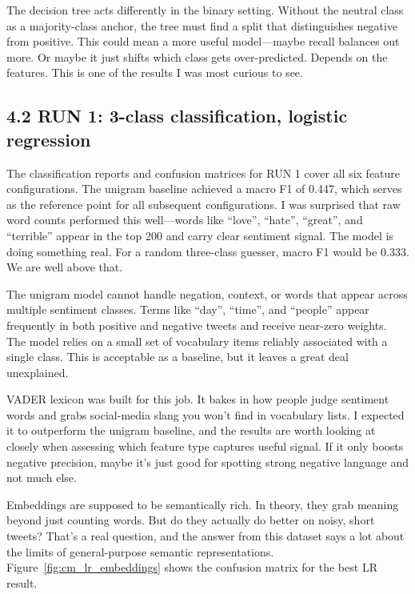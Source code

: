 \documentclass[12pt]{article}
\begin{document}
The decision tree acts differently in the binary setting. Without the neutral class as a majority-class anchor, the tree must find a split that distinguishes negative from positive. This could mean a more useful model---maybe recall balances out more. Or maybe it just shifts which class gets over-predicted. Depends on the features. This is one of the results I was most curious to see.



\subsection*{4.2 RUN 1: 3-class classification, logistic regression}



The classification reports and confusion matrices for RUN 1 cover all six feature configurations. The unigram baseline achieved a macro F1 of 0.447, which serves as the reference point for all subsequent configurations. I was surprised that raw word counts performed this well---words like ``love'', ``hate'', ``great'', and ``terrible'' appear in the top 200 and carry clear sentiment signal. The model is doing something real. For a random three-class guesser, macro F1 would be 0.333. We are well above that.

The unigram model cannot handle negation, context, or words that appear across multiple sentiment classes. Terms like ``day'', ``time'', and ``people'' appear frequently in both positive and negative tweets and receive near-zero weights. The model relies on a small set of vocabulary items reliably associated with a single class. This is acceptable as a baseline, but it leaves a great deal unexplained.

VADER lexicon was built for this job. It bakes in how people judge sentiment words and grabs social-media slang you won't find in vocabulary lists. I expected it to outperform the unigram baseline, and the results are worth looking at closely when assessing which feature type captures useful signal. If it only boosts negative precision, maybe it's just good for spotting strong negative language and not much else.

Embeddings are supposed to be semantically rich. In theory, they grab meaning beyond just counting words. But do they actually do better on noisy, short tweets? That's a real question, and the answer from this dataset says a lot about the limits of general-purpose semantic representations. Figure~\ref{fig:cm_lr_embeddings} shows the confusion matrix for the best LR result.
\end{document}
